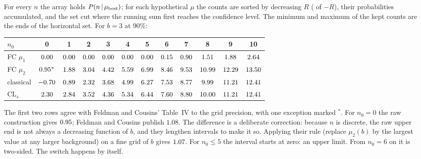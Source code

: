 
For every $n$ the array  holds $P(n\,\vert\,\mu_{\rm best})$; for each
hypothetical $\mu$ the counts are sorted by decreasing $R$ ( of
$-R$), their probabilities accumulated, and the set cut where the running sum
first reaches the confidence level. The minimum and maximum of the kept counts
are the ends of the horizontal set. For $b=3$ at $90\%$:
\begin{center}
\small
\begin{tabular}{l*{11}{c}}
\toprule
$n_0$ & 0 & 1 & 2 & 3 & 4 & 5 & 6 & 7 & 8 & 9 & 10\\
\midrule
FC $\mu_1$ & $0.00$ & $0.00$ & $0.00$ & $0.00$ & $0.00$ & $0.00$ & $0.15$ & $0.90$ & $1.51$ & $1.88$ & $2.64$\\
FC $\mu_2$ & $0.95^{*}$ & $1.88$ & $3.04$ & $4.42$ & $5.59$ & $6.99$ & $8.46$ & $9.53$ & $10.99$ & $12.29$ & $13.50$\\
classical & $-0.70$ & $0.89$ & $2.32$ & $3.68$ & $4.99$ & $6.27$ & $7.53$ & $8.77$ & $9.99$ & $11.21$ & $12.41$\\
CL$_s$ & $2.30$ & $2.84$ & $3.52$ & $4.36$ & $5.34$ & $6.44$ & $7.60$ & $8.80$ & $10.00$ & $11.21$ & $12.41$\\
\bottomrule
\end{tabular}
\end{center}
The first two rows agree with Feldman and Cousins' Table~IV to the grid
precision, with one exception marked $^{*}$. For $n_0=0$ the raw construction
gives $0.95$; Feldman and Cousins publish $1.08$. The difference is
a deliberate correction: because $n$ is discrete, the raw upper end is not always
a decreasing function of $b$, and they lengthen intervals to make it so. Applying
their rule (replace $\mu_2(b)$ by the largest value at any larger background) on
a fine grid of $b$ gives $1.07$. For $n_0\le5$ the interval starts
at zero: an upper limit. From $n_0=6$ on it is two-sided. The switch happens by
itself.

